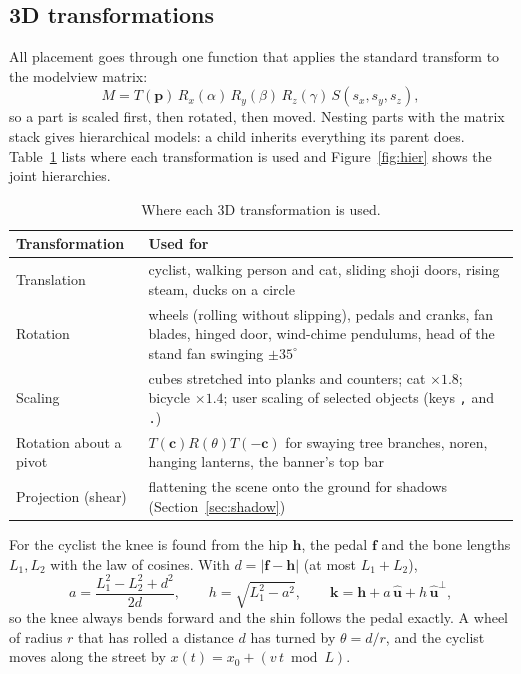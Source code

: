\documentclass[10pt,a4paper]{article}
\newcommand{\code}[1]{\texttt{\small #1}}
\begin{document}
\subsection{3D transformations}\label{sec:xf}
All placement goes through one function that applies the standard transform to the modelview matrix:
\begin{equation}
M = T(\mathbf p)\,R_x(\alpha)\,R_y(\beta)\,R_z(\gamma)\,S(s_x,s_y,s_z),
\end{equation}
so a part is scaled first, then rotated, then moved. Nesting parts with the matrix stack gives hierarchical models: a child inherits everything its parent does. Table~\ref{tab:xf} lists where each transformation is used and Figure~\ref{fig:hier} shows the joint hierarchies.
\begin{table}[htbp]
\centering\small
\begin{tabular}{@{}p{3.2cm}p{12.7cm}@{}}
\toprule
\textbf{Transformation} & \textbf{Used for}\\
\midrule
Translation & cyclist, walking person and cat, sliding shoji doors, rising steam, ducks on a circle\\
Rotation & wheels (rolling without slipping), pedals and cranks, fan blades, hinged door, wind-chime pendulums, head of the stand fan swinging $\pm35^\circ$\\
Scaling & cubes stretched into planks and counters; cat $\times1.8$; bicycle $\times1.4$; user scaling of selected objects (keys \code{,} and \code{.})\\
Rotation about a pivot & $T(\mathbf c)R(\theta)T(-\mathbf c)$ for swaying tree branches, noren, hanging lanterns, the banner's top bar\\
Projection (shear) & flattening the scene onto the ground for shadows (Section~\ref{sec:shadow})\\
\bottomrule
\end{tabular}
\caption{Where each 3D transformation is used.}\label{tab:xf}
\end{table}

For the cyclist the knee is found from the hip $\mathbf h$, the pedal $\mathbf f$ and the bone lengths $L_1,L_2$ with the law of cosines. With $d=|\mathbf f-\mathbf h|$ (at most $L_1+L_2$),
\begin{equation}
a=\frac{L_1^2-L_2^2+d^2}{2d},\qquad h=\sqrt{L_1^2-a^2},\qquad \mathbf k=\mathbf h+a\,\hat{\mathbf u}+h\,\hat{\mathbf u}^{\perp},
\end{equation}
so the knee always bends forward and the shin follows the pedal exactly. A wheel of radius $r$ that has rolled a distance $d$ has turned by $\theta=d/r$, and the cyclist moves along the street by $x(t)=x_0+(v\,t \bmod L)$.
\end{document}

